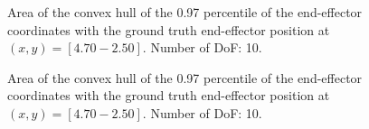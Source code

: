 \documentclass[conference]{IEEEtran}
\begin{document}
\begin{figure}[tbh]
\centering

    \caption{\label{fig:q_quantile:cVAE:10dof} Area of the convex hull of the 0.97 percentile of the end-effector coordinates with the ground truth end-effector position at $(x, y) = [4.70 -2.50]$. Number of DoF: 10.}
\end{figure}

\begin{figure}[tbh]
\centering

    \caption{\label{fig:q_quantile:INN:10dof} Area of the convex hull of the 0.97 percentile of the end-effector coordinates with the ground truth end-effector position at $(x, y) = [4.70 -2.50]$. Number of DoF: 10.}
\end{figure}
\end{document}
